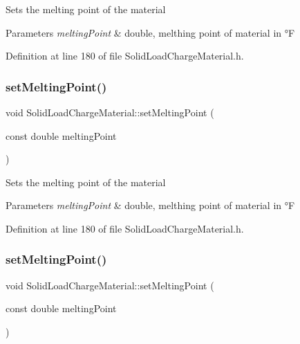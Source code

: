 Sets the melting point of the material 
\begin{DoxyParams}{Parameters}
{\em melting\+Point} & double, melthing point of material in °F \\
\hline
\end{DoxyParams}


Definition at line 180 of file Solid\+Load\+Charge\+Material.\+h.

\mbox{\label{class_solid_load_charge_material_a6c235b1c49be98b02829d37af9c38cb2}} 
\subsubsection{\texorpdfstring{set\+Melting\+Point()}{setMeltingPoint()}\hspace{0.1cm}{\footnotesize\ttfamily [2/3]}}
{\footnotesize\ttfamily void Solid\+Load\+Charge\+Material\+::set\+Melting\+Point (\begin{DoxyParamCaption}\item[{const double}]{melting\+Point }\end{DoxyParamCaption})\hspace{0.3cm}{\ttfamily [inline]}}

Sets the melting point of the material 
\begin{DoxyParams}{Parameters}
{\em melting\+Point} & double, melthing point of material in °F \\
\hline
\end{DoxyParams}


Definition at line 180 of file Solid\+Load\+Charge\+Material.\+h.

\mbox{\label{class_solid_load_charge_material_a6c235b1c49be98b02829d37af9c38cb2}} 
\subsubsection{\texorpdfstring{set\+Melting\+Point()}{setMeltingPoint()}\hspace{0.1cm}{\footnotesize\ttfamily [3/3]}}
{\footnotesize\ttfamily void Solid\+Load\+Charge\+Material\+::set\+Melting\+Point (\begin{DoxyParamCaption}\item[{const double}]{melting\+Point }\end{DoxyParamCaption})\hspace{0.3cm}{\ttfamily [inline]}}

